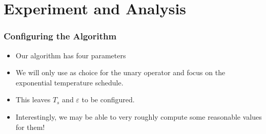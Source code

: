 \documentclass[mathserif]{beamer}%
\begin{document}
\section{Experiment and Analysis}%
%
\begin{frame}%
\frametitle{Configuring the Algorithm}%
\begin{itemize}%
\item Our algorithm has four parameters%
\item<6-> We will only use  as choice for the unary operator and focus on the exponential temperature schedule.%
\item<7-> This leaves $T_s$ and $\varepsilon$ to be configured.%
\item<8-> Interestingly, we may be able to \alert{very roughly compute} some reasonable values for them!%
\end{itemize}%
\end{frame}%
%
\end{document}
